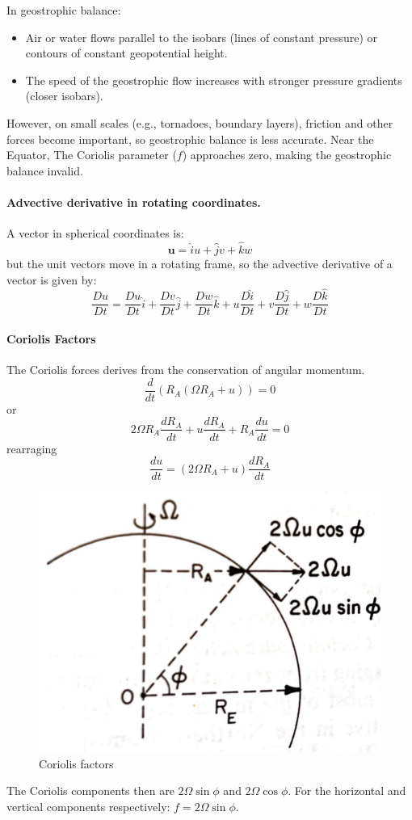 In geostrophic balance:
\begin{itemize}
    \item Air or water flows parallel to the isobars (lines of constant pressure) or contours of constant geopotential height.
    \item The speed of the geostrophic flow increases with stronger pressure gradients (closer isobars).
\end{itemize}
However, on small scales (e.g., tornadoes, boundary layers), friction and other forces become important, so geostrophic balance is less accurate. Near the Equator, The Coriolis parameter ($f$) approaches zero, making the geostrophic balance invalid.

\paragraph{Advective derivative in rotating coordinates.} A vector in spherical coordinates is:
$$\mathbf{u}=\hat{i}u+\hat{j}v+\hat{k}w$$
but the unit vectors move in a rotating frame, so the advective derivative of a vector is given by:
\begin{equation}\label{eq.adv der in rotating}
\frac{Du}{Dt}=\frac{Du}{Dt}\hat{i}+\frac{Dv}{Dt}\hat{j}+\frac{Dw}{Dt}\hat{k}+u\frac{D\hat{i}}{Dt}+v\frac{D\hat{j}}{Dt}+w\frac{D\hat{k}}{Dt}
\end{equation}
\paragraph{Coriolis Factors}
The Coriolis forces derives from the conservation of angular momentum.
$$\frac{d}{dt}\left(R_A(\Omega R_A+u)\right)=0$$
or
$$2\Omega R_A\frac{dR_A}{dt}+u\frac{dR_A}{dt}+R_A\frac{du}{dt}=0$$
rearraging
$$\frac{du}{dt}=(2\Omega R_A+u)\frac{dR_A}{dt}$$
\begin{figure}[h!]
    \centering
    \includegraphics[width=0.35\linewidth]{uploads/Screenshot 2024-11-21 164025.png}
    \caption{Coriolis factors}
    \label{fig:coriolis}
\end{figure}
The Coriolis components then are $2\Omega\sin\phi$ and $2\Omega\cos\phi$. For the horizontal and vertical components respectively:
$f=2\Omega\sin\phi$.

